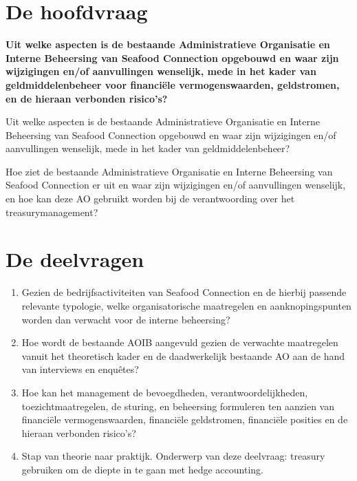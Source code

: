 \documentclass[10pt,a4paper,oneside]{report}
\begin{document}
\section{De hoofdvraag}
\textbf{Uit welke aspecten is de bestaande Administratieve Organisatie en Interne Beheersing van Seafood Connection opgebouwd en waar zijn wijzigingen en/of aanvullingen wenselijk, mede in het kader van geldmiddelenbeheer voor financiële vermogenswaarden, geldstromen, en de hieraan verbonden risico's?}

\bigskip
\noindent
\color{red}
Uit welke aspecten is de bestaande Administratieve Organisatie en Interne Beheersing van Seafood Connection opgebouwd en waar zijn wijzigingen en/of aanvullingen wenselijk, mede in het kader van geldmiddelenbeheer?

\bigskip
\noindent
Hoe ziet de bestaande Administratieve Organisatie en Interne Beheersing van Seafood Connection er uit en waar zijn wijzigingen en/of aanvullingen wenselijk, en hoe kan deze AO gebruikt worden bij de verantwoording over het treasurymanagement?

\color{black}

\section{De deelvragen}
\begin{enumerate}
    \item Gezien de bedrijfsactiviteiten van Seafood Connection en de hierbij passende relevante typologie, welke organisatorische maatregelen en aanknopingspunten worden dan verwacht voor de interne beheersing?
    \item Hoe wordt de bestaande AOIB aangevuld gezien de verwachte maatregelen vanuit het theoretisch kader en de daadwerkelijk bestaande AO aan de hand van interviews en enquêtes?
    \item Hoe kan het management de bevoegdheden, verantwoordelijkheden, toezichtmaatregelen, de sturing, en beheersing formuleren ten aanzien van financiële vermogenswaarden, financiële geldstromen, financiële posities en de hieraan verbonden risico’s?
    \color{red} \item Stap van theorie naar praktijk. Onderwerp van deze deelvraag: treasury gebruiken om de diepte in te gaan met hedge accounting. 
    \color{black}
\end{enumerate}
\end{document}

